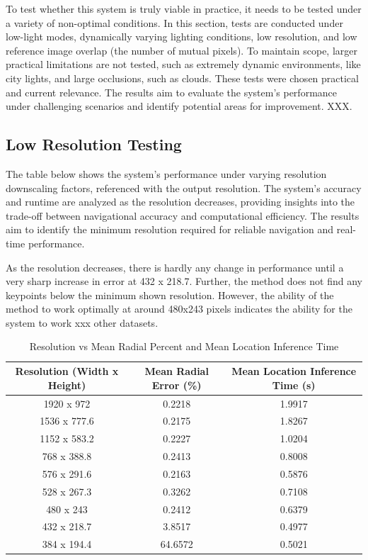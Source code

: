 To test whether this system is truly viable in practice, it needs to be tested under a variety of non-optimal conditions. In this section, tests are conducted under low-light modes, dynamically varying lighting conditions, low resolution, and low reference image overlap (the number of mutual pixels). To maintain scope, larger practical limitations are not tested, such as extremely dynamic environments, like city lights, and large occlusions, such as clouds. These tests were chosen practical and current relevance. The results aim to evaluate the system's performance under challenging scenarios and identify potential areas for improvement. XXX. 

\subsection{Low Resolution Testing}

The table below shows the system's performance under varying resolution downscaling factors, referenced with the output resolution. The system's accuracy and runtime are analyzed as the resolution decreases, providing insights into the trade-off between navigational accuracy and computational efficiency. The results aim to identify the minimum resolution required for reliable navigation and real-time performance.

As the resolution decreases, there is hardly any change in performance until a very sharp increase in error at 432 x 218.7. Further, the method does not find any keypoints below the minimum shown resolution. However, the ability of the method to work optimally at around 480x243 pixels indicates the ability for the system to work xxx other datasets. 

\begin{table}[H]
    \centering
    \begin{tabular}{|c|c|c|}
    \hline
    \textbf{Resolution (Width x Height)} & \textbf{Mean Radial Error (\%)} & \textbf{Mean Location Inference Time (s)} \\
    \hline
    1920 x 972 & 0.2218 & 1.9917 \\
    1536 x 777.6 & 0.2175 & 1.8267 \\
    1152 x 583.2 & 0.2227 & 1.0204 \\
    768 x 388.8 & 0.2413 & 0.8008 \\
    576 x 291.6 & 0.2163 & 0.5876 \\
    528 x 267.3 & 0.3262 & 0.7108 \\
    480 x 243 & 0.2412 & 0.6379 \\
    432 x 218.7 & 3.8517 & 0.4977 \\
    384 x 194.4 & 64.6572 & 0.5021 \\
    \hline
    \end{tabular}
    \caption{Resolution vs Mean Radial Percent and Mean Location Inference Time}
    \label{tab:resolution_radial_percent_location_time}
\end{table}
    








